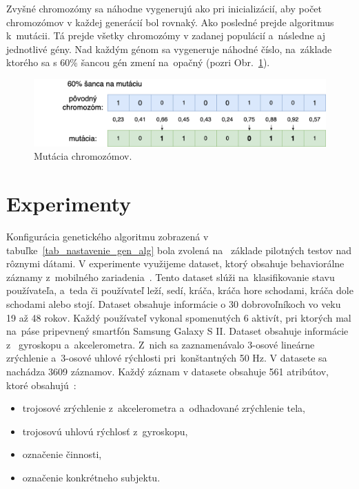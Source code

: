 \documentclass[runningheads]{llncs}
\begin{document}
Zvyšné chromozómy sa náhodne vygenerujú ako pri inicializácií, aby počet chromozómov v každej generácií bol rovnaký. 
Ako posledné prejde algoritmus k~mutácii. Tá prejde všetky chromozómy v zadanej populácií a~následne aj jednotlivé gény.
Nad každým génom sa vygeneruje náhodné číslo, na~základe ktorého sa s 60\% šancou gén zmení na~opačný (pozri Obr.~\ref{fig_ga_mutovanie}). 

\begin{figure}
\includegraphics[width=\textwidth]{image/mutacia.png}
\caption{Mutácia chromozómov.} \label{fig_ga_mutovanie}
\end{figure}




\section{Experimenty}

Konfigurácia genetického algoritmu zobrazená v tabuľke~\ref{tab_nastavenie_gen_alg} bola zvolená na~
základe pilotných testov nad rôznymi dátami. V experimente využijeme dataset, ktorý obsahuje behaviorálne 
záznamy z~mobilného zariadenia~\cite{ref_dataset_anguita,ref_dataset}. Tento dataset slúži na~klasifikovanie
stavu používateľa, a~teda či používateľ leží, sedí, kráča, kráča hore schodami, kráča dole schodami alebo stojí.
Dataset obsahuje informácie o 30 dobrovoľníkoch vo veku 19 až 48 rokov. Každý používateľ vykonal spomenutých
6 aktivít, pri ktorých mal na~páse pripevnený smartfón Samsung Galaxy S II. Dataset obsahuje informácie z~
gyroskopu a~akcelerometra. Z~nich sa zaznamenávalo 3-osové lineárne zrýchlenie a~3-osové uhlové rýchlosti 
pri~konštantných 50 Hz. V datasete sa nachádza 3609 záznamov. Každý záznam v datasete obsahuje 561 atribútov, ktoré obsahujú~\cite{ref_dataset_anguita}:

\begin{itemize}
\item trojosové zrýchlenie z~akcelerometra a~odhadované zrýchlenie tela,
\item trojosovú uhlovú rýchlosť z~gyroskopu,
\item označenie činnosti,
\item označenie konkrétneho subjektu.
\end{itemize}
\end{document}

